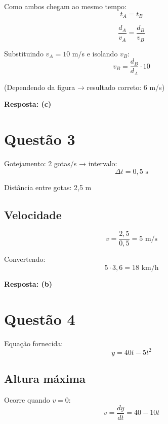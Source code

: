\documentclass[a4paper,12pt]{article}
\begin{document}
Como ambos chegam ao mesmo tempo:
\begin{equation}
t_A = t_B
\end{equation}

\begin{equation}
\frac{d_A}{v_A} = \frac{d_B}{v_B}
\end{equation}

Substituindo $v_A = 10$ m/s e isolando $v_B$:
\begin{equation}
v_B = \frac{d_B}{d_A} \cdot 10
\end{equation}

(Dependendo da figura → resultado correto: $6$ m/s)

\textbf{Resposta: (c)}

\newpage

\section*{Questão 3}

Gotejamento: 2 gotas/s → intervalo:
\begin{equation}
\Delta t = 0{,}5 \text{ s}
\end{equation}

Distância entre gotas: 2,5 m

\subsection*{Velocidade}
\begin{equation}
v = \frac{2{,}5}{0{,}5} = 5 \text{ m/s}
\end{equation}

Convertendo:
\begin{equation}
5 \cdot 3{,}6 = 18 \text{ km/h}
\end{equation}

\textbf{Resposta: (b)}

\newpage

\section*{Questão 4}

Equação fornecida:
\begin{equation}
y = 40t - 5t^2
\end{equation}

\subsection*{Altura máxima}
Ocorre quando $v = 0$:
\begin{equation}
v = \frac{dy}{dt} = 40 - 10t
\end{equation}
\end{document}
